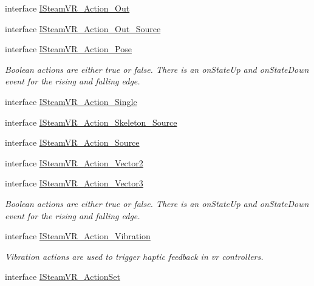 \begin{DoxyCompactItemize}
\item 
interface \mbox{\hyperlink{interface_valve_1_1_v_r_1_1_i_steam_v_r___action___out}{I\+Steam\+V\+R\+\_\+\+Action\+\_\+\+Out}}
\item 
interface \mbox{\hyperlink{interface_valve_1_1_v_r_1_1_i_steam_v_r___action___out___source}{I\+Steam\+V\+R\+\_\+\+Action\+\_\+\+Out\+\_\+\+Source}}
\item 
interface \mbox{\hyperlink{interface_valve_1_1_v_r_1_1_i_steam_v_r___action___pose}{I\+Steam\+V\+R\+\_\+\+Action\+\_\+\+Pose}}
\begin{DoxyCompactList}\small\item\em Boolean actions are either true or false. There is an on\+State\+Up and on\+State\+Down event for the rising and falling edge. \end{DoxyCompactList}\item 
interface \mbox{\hyperlink{interface_valve_1_1_v_r_1_1_i_steam_v_r___action___single}{I\+Steam\+V\+R\+\_\+\+Action\+\_\+\+Single}}
\item 
interface \mbox{\hyperlink{interface_valve_1_1_v_r_1_1_i_steam_v_r___action___skeleton___source}{I\+Steam\+V\+R\+\_\+\+Action\+\_\+\+Skeleton\+\_\+\+Source}}
\item 
interface \mbox{\hyperlink{interface_valve_1_1_v_r_1_1_i_steam_v_r___action___source}{I\+Steam\+V\+R\+\_\+\+Action\+\_\+\+Source}}
\item 
interface \mbox{\hyperlink{interface_valve_1_1_v_r_1_1_i_steam_v_r___action___vector2}{I\+Steam\+V\+R\+\_\+\+Action\+\_\+\+Vector2}}
\item 
interface \mbox{\hyperlink{interface_valve_1_1_v_r_1_1_i_steam_v_r___action___vector3}{I\+Steam\+V\+R\+\_\+\+Action\+\_\+\+Vector3}}
\begin{DoxyCompactList}\small\item\em Boolean actions are either true or false. There is an on\+State\+Up and on\+State\+Down event for the rising and falling edge. \end{DoxyCompactList}\item 
interface \mbox{\hyperlink{interface_valve_1_1_v_r_1_1_i_steam_v_r___action___vibration}{I\+Steam\+V\+R\+\_\+\+Action\+\_\+\+Vibration}}
\begin{DoxyCompactList}\small\item\em Vibration actions are used to trigger haptic feedback in vr controllers. \end{DoxyCompactList}\item 
interface \mbox{\hyperlink{interface_valve_1_1_v_r_1_1_i_steam_v_r___action_set}{I\+Steam\+V\+R\+\_\+\+Action\+Set}}

\end{DoxyCompactItemize}
